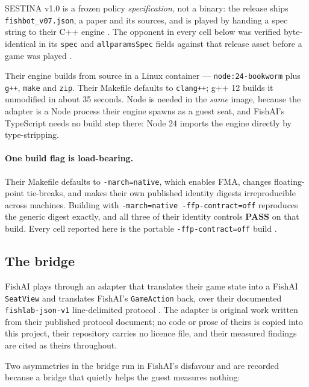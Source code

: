 \documentclass[11pt]{article}
\newcommand{\code}[1]{\texttt{#1}}
\begin{document}
SESTINA v1.0 is a frozen policy \emph{specification}, not a binary: the release ships
\code{fishbot\_v07.json}, a paper and its sources, and is played by handing a spec string to their
C++ engine \cite{fishlab}. The opponent in every cell below was verified byte-identical in its
\code{spec} and \code{allparamsSpec} fields against that release asset before a game was played
\cite{crossplay}.

Their engine builds from source in a Linux container --- \code{node:24-bookworm} plus \code{g++},
\code{make} and \code{zip}. Their Makefile defaults to \code{clang++}; g++ 12 builds it unmodified
in about 35 seconds. Node is needed in the \emph{same} image, because the adapter is a Node process
their engine spawns as a guest seat, and FishAI's TypeScript needs no build step there: Node 24
imports the engine directly by type-stripping.

\paragraph{One build flag is load-bearing.} Their Makefile defaults to \code{-march=native}, which
enables FMA, changes floating-point tie-breaks, and makes their own published identity digests
irreproducible across machines. Building with \code{-march=native -ffp-contract=off} reproduces the
generic digest exactly, and all three of their identity controls \textbf{PASS} on that build. Every
cell reported here is the portable \code{-ffp-contract=off} build \cite{crossplay}.

\subsection{The bridge}

FishAI plays through an adapter that translates their game state into a FishAI \code{SeatView} and
translates FishAI's \code{GameAction} back, over their documented \code{fishlab-json-v1}
line-delimited protocol \cite{fishlab}. The adapter is original work written from their published
protocol document; no code or prose of theirs is copied into this project, their repository carries
no licence file, and their measured findings are cited as theirs throughout.

Two asymmetries in the bridge run in FishAI's disfavour and are recorded because a bridge that
quietly helps the guest measures nothing:
\end{document}
